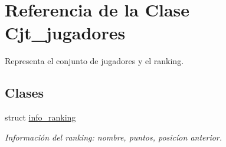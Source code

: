 \hypertarget{class_cjt__jugadores}{}\section{Referencia de la Clase Cjt\+\_\+jugadores}
\label{class_cjt__jugadores}


Representa el conjunto de jugadores y el ranking.  


\subsection*{Clases}
\begin{DoxyCompactItemize}
\item 
struct \hyperlink{struct_cjt__jugadores_1_1info__ranking}{info\+\_\+ranking}
\begin{DoxyCompactList}\small\item\em Información del ranking\+: nombre, puntos, posicíon anterior. \end{DoxyCompactList}\end{DoxyCompactItemize}
